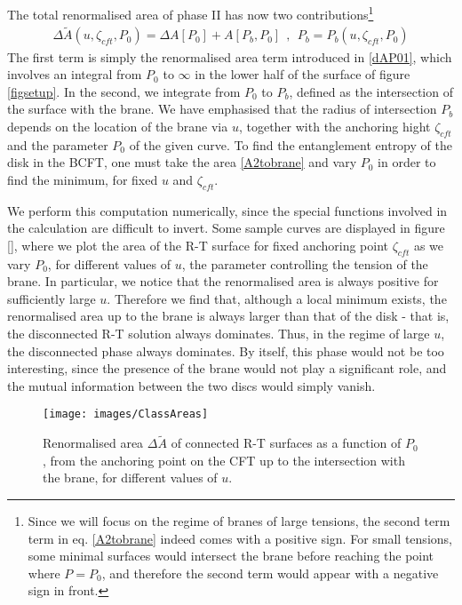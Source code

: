 The total renormalised area of phase II has now two contributions\footnote{Since we will focus on the regime of branes of large tensions, the second term term in eq. \eqref{A2tobrane} indeed comes with a positive sign. For small tensions, some minimal surfaces would intersect the brane before reaching the point where $P=P_0$, and therefore the second term would appear with a negative sign in front. }
\begin{align}\label{A2tobrane}
\Delta \tilde A(u,\zeta_{cft},P_0)=\Delta A[P_0]+A[P_b,P_0]\ \ ,\ \ P_b=P_b(u,\zeta_{cft},P_0)
\end{align}
The first term is simply the renormalised area term introduced in \eqref{dAP01}, which involves an integral from $P_0$ to $\infty$ in the lower half of the surface of figure \ref{figsetup}. In the second, we integrate from $P_0$ to $P_b$, defined as the intersection of the surface with the brane. We have emphasised that the radius of intersection $P_b$ depends on the location of the brane via $u$, together with the anchoring hight $\zeta_{cft}$ and the parameter $P_0$ of the given curve. To find the entanglement entropy of the disk in the BCFT, one must take the area \eqref{A2tobrane} and vary $P_0$ in order to find the minimum, for fixed $u$ and $\zeta_{cft}$.

We perform this computation numerically, since the special functions involved in the calculation are difficult to invert. Some sample curves are displayed in figure \ref{}, where we plot the area of the R-T surface for fixed anchoring point $\zeta_{cft}$ as we vary $P_0$, for different values of $u$, the parameter controlling the tension of the brane. In particular, we notice that the renormalised area is always positive for sufficiently large $u$. Therefore we find that, although a local minimum exists, the renormalised area up to the brane is always larger than that of the disk -  that is, the disconnected R-T solution always dominates. Thus, in the regime of large $u$, the disconnected phase always dominates. By itself, this phase would not be too interesting, since the presence of the brane would not play a significant role, and the mutual information between the two discs would simply vanish.
\begin{figure}[h]
\begin{center}
\texttt{[image: images/ClassAreas]}
\caption{ Renormalised area $\Delta\tilde A$ of connected R-T surfaces as a function of $P_0$, from the anchoring point on the CFT up to the intersection with the brane, for different values of $u$. }
\label{figClassAreas}
\end{center}
\end{figure}

